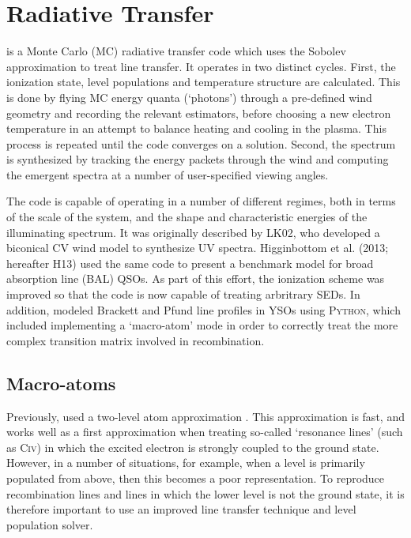 \documentclass[preprint, a4paper, 11pt]{aastex}
\begin{document}
\section{Radiative Transfer}

\py is a Monte Carlo (MC) radiative transfer code which uses
the Sobolev approximation to treat line transfer. It operates 
in two distinct cycles. First, the ionization state, level populations
and temperature structure are calculated. This is done by
flying MC energy quanta (`photons') through a pre-defined wind geometry and recording
the relevant estimators, before choosing  a new electron temperature 
in an attempt to balance heating and cooling in the plasma.
This process is repeated until the code converges on a 
solution. Second, the spectrum is synthesized by tracking
the energy packets through the wind and computing the 
emergent spectra at a number of user-specified viewing angles.

The code is capable of operating in a number of different
regimes, both in terms of the scale of the system, and the 
shape and characteristic energies of the illuminating spectrum. 
It was originally described by LK02, who developed a biconical CV 
wind model to synthesize UV spectra. 
Higginbottom et al.\nocite{higginbottom2013} (2013; hereafter H13) used the same code to
present a benchmark model for broad absorption line (BAL) QSOs.
As part of this effort, the ionization scheme was improved so that 
the code is now capable of treating arbritrary SEDs.
In addition, \cite[][SDL05]{simmacro2005} modeled
Brackett and Pfund line profiles in YSOs using \textsc{Python,} which included
implementing a `macro-atom' mode in order to correctly treat the more
complex transition matrix involved in recombination. 



\subsection{Macro-atoms}

Previously, \py used a two-level atom approximation \cite[see e.g.][]{mihalas}. This approximation is 
fast, and works well as a first approximation when treating so-called `resonance lines' (such as C\textsc{iv}) 
in which the excited electron is strongly coupled to the ground state.
However, in a number of situations, for example, when a level is primarily populated from above, then
this becomes a poor representation. 
To reproduce recombination lines and lines in which the lower level is not the ground state, 
it is therefore important to use an improved line transfer technique and level population solver.
\end{document}
